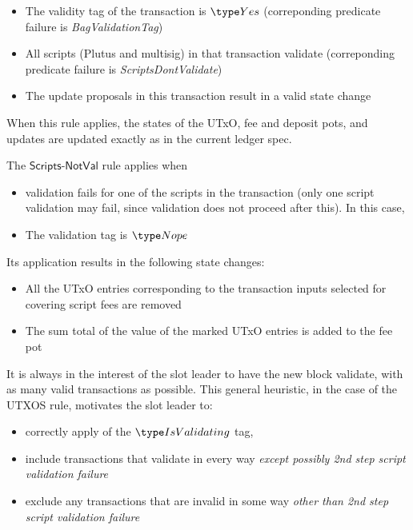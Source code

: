 \begin{itemize}
  \item The validity tag of the transaction is $\Yes$
  (correponding predicate failure is \emph{BagValidationTag})
  \item All scripts (Plutus and multisig) in that transaction validate
  (correponding predicate failure is \emph{ScriptsDontValidate})
  \item The update proposals in this transaction result in a valid state change
\end{itemize}

When this rule applies, the states of the UTxO, fee
  and deposit pots, and updates are updated exactly as in the current
  ledger spec.

The $\mathsf{Scripts\mbox{-}NotVal}$ rule applies when

\begin{itemize}
  \item validation fails
  for one of the scripts in the transaction (only one script validation may fail,
  since validation does not proceed after this). In this case,
  \item The validation tag is $\Nope$
\end{itemize}

Its application results in the following state changes:

\begin{itemize}
  \item All the
  UTxO entries corresponding to the transaction inputs selected for covering
  script fees are removed

  \item The sum total of the value of the marked UTxO entries
  is added to the fee pot
\end{itemize}

It is always in the interest of the slot leader to have the new block validate,
with as many valid transactions as possible. This general heuristic,
in the case of the UTXOS rule, motivates the
slot leader to:

\begin{itemize}
  \item correctly apply of the $\IsValidating$ tag,
  \item include transactions that validate in every way
  \textit{except possibly 2nd step script validation failure}
  \item exclude any transactions that are invalid
in some way \textit{other than 2nd step script validation failure}
\end{itemize}


